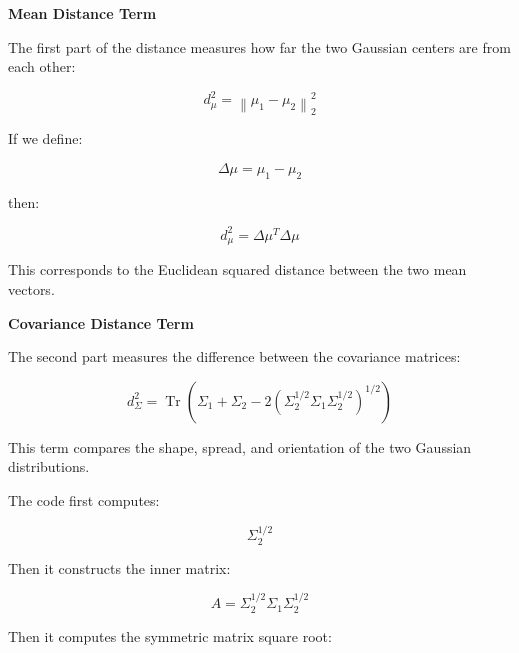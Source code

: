 \documentclass{book}
\providecommand{\ProjectDeepHeading}[2]{%
    \par\medskip\noindent\textbf{#2}\par\smallskip
}
\begin{document}
    
    \ProjectDeepHeading{6}{Mean Distance Term}
        
        The first part of the distance measures how far the two Gaussian centers are from each other:
        
        \[
            d_{\ensuremath{\mu}}^2
            =
            \left\lVert
                \ensuremath{\mu}_1 - \ensuremath{\mu}_2
            \right\rVert_2^2
        \]
        
        If we define:
        
        \[
            \ensuremath{\Delta} \ensuremath{\mu}
            =
            \ensuremath{\mu}_1 - \ensuremath{\mu}_2
        \]
        
        then:
        
        \[
            d_{\ensuremath{\mu}}^2
            =
            \ensuremath{\Delta} \ensuremath{\mu}^T
            \ensuremath{\Delta} \ensuremath{\mu}
        \]
        
        This corresponds to the Euclidean squared distance between the two mean vectors.
    
    
    \ProjectDeepHeading{6}{Covariance Distance Term}
        
        The second part measures the difference between the covariance matrices:
        
        \[
            d_{\ensuremath{\Sigma}}^2
            =
            \operatorname{Tr}
            \left(
                \ensuremath{\Sigma}_1
            +
                \ensuremath{\Sigma}_2
            -
            2
                \left(
                    \ensuremath{\Sigma}_2^{1/2}
                    \ensuremath{\Sigma}_1
                    \ensuremath{\Sigma}_2^{1/2}
                \right)^{1/2}
            \right)
        \]
        
        This term compares the shape, spread, and orientation of the two Gaussian distributions.
        
        The code first computes:
        
        \[
            \ensuremath{\Sigma}_2^{1/2}
        \]
        
        Then it constructs the inner matrix:
        
        \[
            A
            =
            \ensuremath{\Sigma}_2^{1/2}
            \ensuremath{\Sigma}_1
            \ensuremath{\Sigma}_2^{1/2}
        \]
        
        Then it computes the symmetric matrix square root:
        
\end{document}
